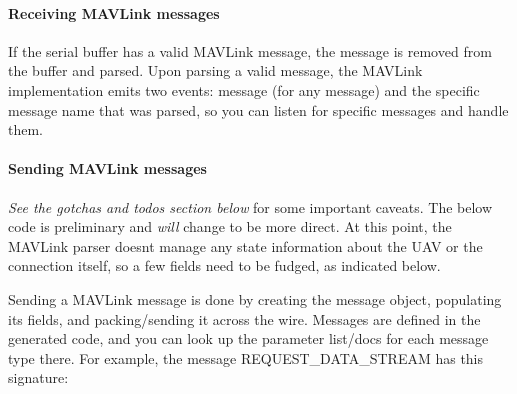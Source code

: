 \paragraph*{Receiving M\+A\+V\+Link messages}

If the serial buffer has a valid M\+A\+V\+Link message, the message is removed from the buffer and parsed. Upon parsing a valid message, the M\+A\+V\+Link implementation emits two events\+: {\ttfamily message} (for any message) and the specific message name that was parsed, so you can listen for specific messages and handle them.


\begin{DoxyCode}{0}
\DoxyCodeLine{\});}
\DoxyCodeLine{}
\DoxyCodeLine{\});}
\end{DoxyCode}


\paragraph*{Sending M\+A\+V\+Link messages}

{\itshape See the gotcha\textquotesingle{}s and todo\textquotesingle{}s section below} for some important caveats. The below code is preliminary and {\itshape will} change to be more direct. At this point, the M\+A\+V\+Link parser doesn\textquotesingle{}t manage any state information about the U\+AV or the connection itself, so a few fields need to be fudged, as indicated below.

Sending a M\+A\+V\+Link message is done by creating the message object, populating its fields, and packing/sending it across the wire. Messages are defined in the generated code, and you can look up the parameter list/docs for each message type there. For example, the message {\ttfamily R\+E\+Q\+U\+E\+S\+T\+\_\+\+D\+A\+T\+A\+\_\+\+S\+T\+R\+E\+AM} has this signature\+:


\begin{DoxyCode}{0}
\end{DoxyCode}


